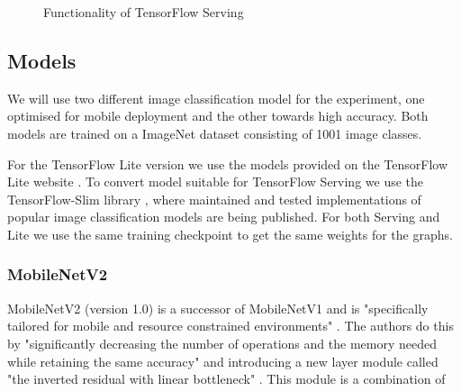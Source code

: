 \begin{figure}[H]
\centering

\caption{Functionality of TensorFlow Serving}
\label{fig:cloud}
\end{figure}
\subsection{Models}
\label{chap:models}
We will use two different image classification model for the experiment, one optimised for mobile deployment and the other towards high accuracy.
Both models are trained on a ImageNet dataset consisting of 1001 image classes.

For the TensorFlow Lite version we use the models provided on the TensorFlow Lite website \cite{tfLiteModels}.
To convert model suitable for TensorFlow Serving we use the TensorFlow-Slim library \cite{tfSlim}, where maintained and tested implementations of popular image classification models are being published. For both Serving and Lite we use the same training checkpoint to get the same weights for the graphs.


\subsubsection{MobileNetV2}
MobileNetV2 (version 1.0) is a successor of MobileNetV1 and is "specifically tailored for mobile and resource
constrained environments" \cite{DBLP:journals/corr/abs-1801-04381}. The authors do this by "significantly decreasing the number of operations and the memory needed while retaining the same accuracy"  \cite{DBLP:journals/corr/abs-1801-04381} and introducing a new layer module called "the
inverted residual with linear bottleneck" \cite{DBLP:journals/corr/abs-1801-04381}.
This module is a combination of 

